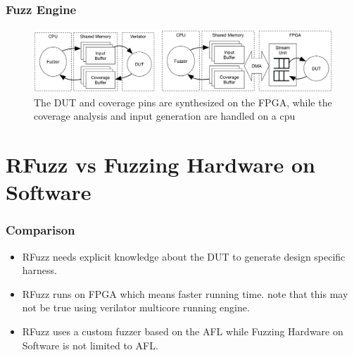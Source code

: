 \documentclass{beamer}
\begin{document}
\begin{frame}
    \frametitle{Fuzz Engine}
    \begin{figure}
        \centering
        \includegraphics[width=1.0\textwidth]{rfuzz.png}
        \caption{The DUT and coverage pins are synthesized on the FPGA,
        while the coverage analysis and input generation are handled on a cpu}
        \label{fig:rfuzz}
    \end{figure}
\end{frame}

\section{RFuzz vs Fuzzing Hardware on Software}
\begin{frame}
    \frametitle{Comparison}
    \begin{itemize}
        \item RFuzz needs explicit knowledge about the DUT to generate design
            specific harness.
        \item RFuzz runs on FPGA which means faster running time. note
            that this may not be true using verilator multicore running engine.
        \item RFuzz uses a custom fuzzer based on the AFL while Fuzzing
            Hardware on Software is not limited to AFL.
    \end{itemize}
\end{frame}
\end{document}
